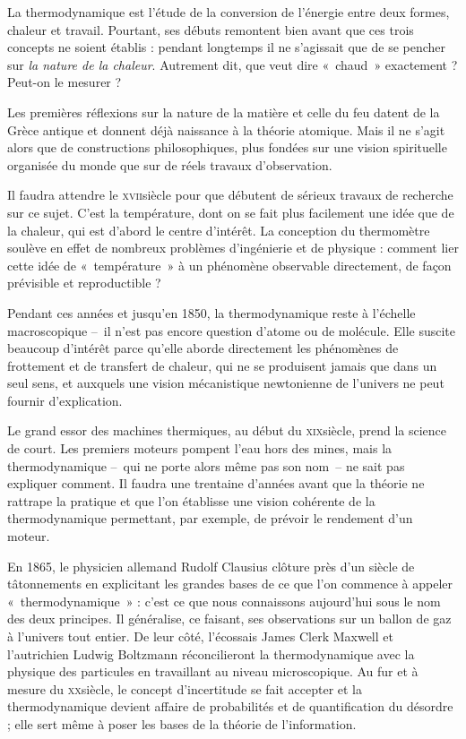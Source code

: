 La thermodynamique est l’étude de la conversion de l’énergie entre deux formes, chaleur et travail. Pourtant, ses débuts remontent bien avant que ces trois concepts ne soient établis : pendant longtemps il ne s’agissait que de se pencher sur \emph{la nature de la chaleur}. Autrement dit, que veut dire «~chaud~» exactement ? Peut-on le mesurer ?

Les premières réflexions sur la nature de la matière et celle du feu datent de la Grèce antique et donnent déjà naissance à la théorie atomique. Mais il ne s’agit alors que de constructions philosophiques, plus fondées sur une vision spirituelle organisée du monde que sur de réels travaux d’observation.

Il faudra attendre le \textsc{xvii}\ieme siècle pour que débutent de sérieux travaux de recherche sur ce sujet. C’est la température, dont on se fait plus facilement une idée que de la chaleur, qui est d’abord le centre d’intérêt. La conception du thermomètre soulève en effet de nombreux problèmes d’ingénierie et de physique : comment lier cette idée de «~température~» à un phénomène observable directement, de façon prévisible et reproductible ?

Pendant ces années et jusqu’en 1850, la thermodynamique reste à l’échelle macroscopique –~il n’est pas encore question d’atome ou de molécule. Elle suscite beaucoup d’intérêt parce qu’elle aborde directement les phénomènes de frottement et de transfert de chaleur, qui ne se produisent jamais que dans un seul sens, et auxquels une vision mécanistique newtonienne de l’univers ne peut fournir d’explication.

Le grand essor des machines thermiques, au début du \textsc{xix}\ieme siècle, prend la science de court. Les premiers moteurs pompent l’eau hors des mines, mais la thermodynamique –\ qui ne porte alors même pas son nom\ – ne sait pas expliquer comment. Il faudra une trentaine d’années avant que la théorie ne rattrape la pratique et que l’on établisse une vision cohérente de la thermodynamique permettant, par exemple, de prévoir le rendement d’un moteur.

En 1865, le physicien allemand Rudolf Clausius clôture près d’un siècle de tâtonnements en explicitant les grandes bases de ce que l’on commence à appeler «~thermodynamique~» : c’est ce que nous connaissons aujourd’hui sous le nom des deux principes. Il généralise, ce faisant, ses observations sur un ballon de gaz à l’univers tout entier.
De leur côté, l’écossais James Clerk Maxwell et l’autrichien Ludwig Boltzmann réconcilieront la thermodynamique avec la physique des particules en travaillant au niveau microscopique. Au fur et à mesure du \textsc{xx}\ieme siècle, le concept d’incertitude se fait accepter et la thermodynamique devient affaire de probabilités et de quantification du désordre ; elle sert même à poser les bases de la théorie de l’information.

